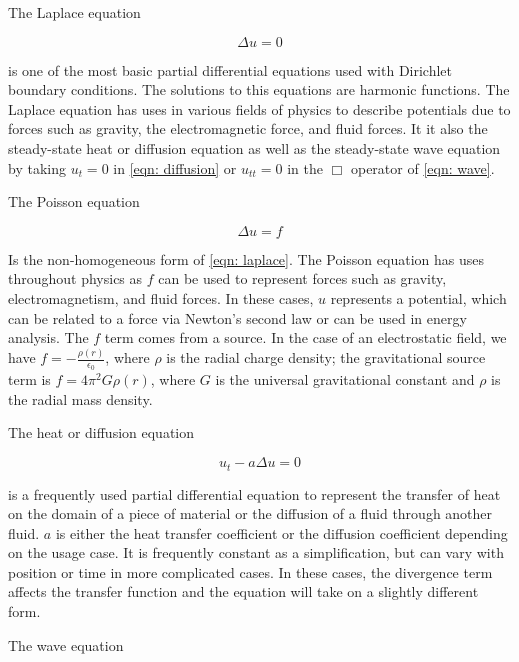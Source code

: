 \documentclass[10pt,a4paper]{article}
\begin{document}
The Laplace equation

\begin{equation}
\Delta u = 0 \label{eqn: laplace}
\end{equation}

is one of the most basic partial differential equations used with Dirichlet boundary conditions. The solutions to this equations are harmonic functions. The Laplace equation has uses in various fields of physics to describe potentials due to forces such as gravity, the electromagnetic force, and fluid forces. It it also the steady-state heat or diffusion equation as well as the steady-state wave equation by taking $u_t = 0$ in \cref{eqn: diffusion} or $u_{tt} = 0$ in the $\Box$ operator of \cref{eqn: wave}.

The Poisson equation

\begin{equation}
\Delta u = f \label{eqn: poisson}
\end{equation}

Is the non-homogeneous form of \cref{eqn: laplace}. The Poisson equation has uses throughout physics as $f$ can be used to represent forces such as gravity, electromagnetism, and fluid forces. In these cases, $u$ represents a potential, which can be related to a force via Newton's second law or can be used in energy analysis. The $f$ term comes from a source. In the case of an electrostatic field, we have $f = - \frac{\rho (r)}{\epsilon_0}$, where $\rho$ is the radial charge density; the gravitational source term is $f = 4 \pi^2 G \rho(r)$, where $G$ is the universal gravitational constant and $\rho$ is the radial mass density.

The heat or diffusion equation

\begin{equation}
u_t - a \Delta u = 0 \label{eqn: diffusion}
\end{equation}

is a frequently used partial differential equation to represent the transfer of heat on the domain of a piece of material or the diffusion of a fluid through another fluid. $a$ is either the heat transfer coefficient or the diffusion coefficient depending on the usage case. It is frequently constant as a simplification, but can vary with position or time in more complicated cases. In these cases, the divergence term affects the transfer function and the equation will take on a slightly different form.

The wave equation
\end{document}
